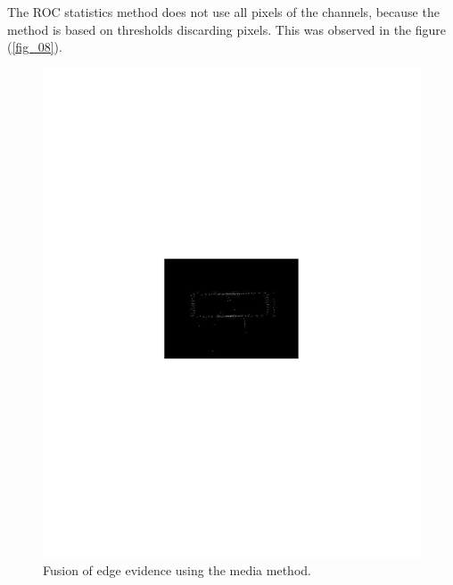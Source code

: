 \documentclass[conference]{IEEEtran}
\begin{document}
{{{{The ROC statistics method does not use all pixels of the channels, because the method is based on thresholds discarding pixels. This was observed in the figure (\ref{fig_08}).
\begin{figure}[hbt]
	\includegraphics[scale=0.5]{flevoland_fusao_swt_crop.pdf}
	\caption{Fusion of edge evidence using the media method.}
\label{fig_05}
\end{figure}
\begin{figure}[hbt]

\end{figure}}}}}
\end{document}
